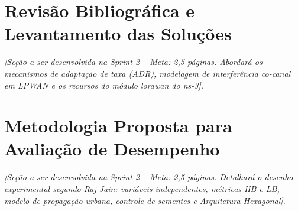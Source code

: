 \documentclass[12pt]{article}
\begin{document}
\section{Revisão Bibliográfica e Levantamento das Soluções}
\label{sec:revisao}
\textit{[Seção a ser desenvolvida na Sprint 2 -- Meta: 2,5 páginas. Abordará os mecanismos de adaptação de taxa (ADR), modelagem de interferência co-canal em LPWAN e os recursos do módulo lorawan do ns-3].}

\section{Metodologia Proposta para Avaliação de Desempenho}
\label{sec:metodologia}
\textit{[Seção a ser desenvolvida na Sprint 2 -- Meta: 2,5 páginas. Detalhará o desenho experimental segundo Raj Jain: variáveis independentes, métricas HB e LB, modelo de propagação urbana, controle de sementes e Arquitetura Hexagonal].}



\end{document}
